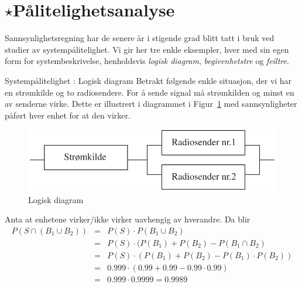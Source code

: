 \section{$\star$Pålitelighetsanalyse}
\small
Sannsynlighetsregning har de senere år i stigende grad blitt tatt i
bruk ved studier av systempålitelighet. Vi gir her tre enkle eksempler,
hver med sin egen form for systembeskrivelse, henholdsvis
{\em logisk diagram}, {\em begivenhetstre} og {\em feiltre}.\\

\begin{eksempel}{Systempålitelighet : Logisk diagram}
Betrakt  følgende enkle situasjon, der vi har en strømkilde og to
radiosendere. For å sende signal må strømkilden og minst en av
senderne virke. Dette er illustrert i diagrammet i Figur~\ref{fig:logisk_diagram} med
sannsynligheter påført hver enhet for at den virker.

\begin{figure}[ht]
\centering\centering
 \includegraphics[scale=0.8]{figurer/fig4_5.pdf}
\caption{Logisk diagram}
	\label{fig:logisk_diagram}
\end{figure}

Anta at enhetene virker/ikke virker uavhengig av hverandre. Da blir
\begin{eqnarray*}
 P(S \cap (B_1 \cup B_2)) &=& P(S) \cdot P(B_1 \cup B_2) \\
                          &=& P(S) \cdot (P(B_1)+P(B_2)-P(B_1 \cap B_2) \\
                          &=& P(S) \cdot (P(B_1)+P(B_2)-P(B_1) \cdot P(B_2)) \\
                          &=& 0.999 \cdot (0.99+0.99-0.99 \cdot 0.99) \\
                          &=& 0.999 \cdot 0.9999=0.9989
\end{eqnarray*}
\end{eksempel}
